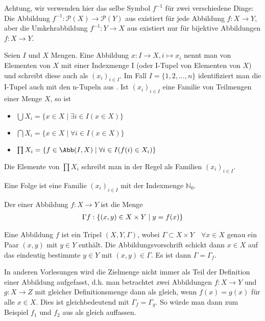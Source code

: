 \begin{remark}
	Achtung, wir verwenden hier das selbe Symbol $f^{-1}$ für zwei verschiedene Dinge: Die Abbildung
	$f^{-1}: \mathcal P(X) \to \mathcal P(Y)$ aus  existiert für jede Abbildung $f: X \to Y$, aber die
	Umkehrabbildung $f^{-1}: Y \to X$ aus  existiert nur für bijektive Abbildungen $f: X \to Y$.
\end{remark}

\begin{definition}[Familie]
	Seien $I$ und $X$ Mengen. Eine Abbildung $x: I \to X, i \mapsto
	x_i$ nennt man  von Elementen von $X$ mit einer Indexmenge I (oder I-Tupel von 
	Elementen von $X$) und schreibt diese auch als $(x_i)_{i \in I}$. Im Fall $I=\{1,2,...,n\}$
	identifiziert man die I-Tupel auch mit den n-Tupeln aus . Ist $(x_i)_{i \in I}$ eine Familie von
	Teilmengen einer Menge $X$, so ist 
	\begin{itemize}
		\item $\bigcup X_i = \{x \in X \mid \exists i \in I(x \in X)\}$
		\item $\bigcap X_i = \{x \in X \mid \forall i \in I(x \in X)\}$
		\item $\prod X_i = \{f \in \Abb(I,X) \mid \forall i \in I(f(i) \in X_i)\}$
	\end{itemize}
	Die Elemente von $\prod X_i$ schreibt man in der Regel als Familien $(x_i)_{i \in I}$.
\end{definition}

\begin{example}
	Eine Folge ist eine Familie $(x_i)_{i \in I}$ mit der Indexmenge $\mathbb{N}_0$.
\end{example}

\begin{definition}[Graph]
	Der  einer Abbildung $f: X \to Y$ ist die Menge
	\begin{align}
		\Gamma f: \{(x,y) \in X \times Y \mid y=f(x)\}\notag
	\end{align}
\end{definition}

\begin{remark}
	Eine Abbildung $f$ ist ein Tripel $(X,Y,\Gamma)$, wobei $\Gamma \subset X \times Y \quad \forall
	x \in X$ genau ein Paar $(x,y)$ mit $y \in Y$ enthält. Die Abbildungsvorschrift schickt dann
	$x \in X$ auf das eindeutig bestimmte $y \in Y$ mit $(x,y) \in \Gamma$. Es ist dann $\Gamma =
	\Gamma_f$.
\end{remark}

\begin{remark}
	In anderen Vorlesungen wird die Zielmenge nicht immer als Teil der Definition einer Abbildung aufgefasst, d.h. man betrachtet zwei Abbildungen $f:X\to Y$ und $g:X\to Z$ mit gleicher Definitionsmenge dann als gleich, wenn $f(x)=g(x)$ für alle $x\in X$. Dies ist gleichbedeutend mit $\Gamma_f=\Gamma_g$. So würde man dann zum Beispiel $f_1$ und $f_2$ aus  als gleich auffassen.
\end{remark}
